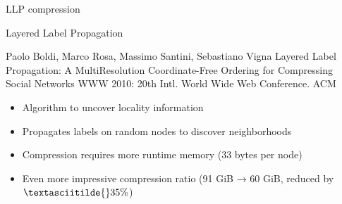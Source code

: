 \documentclass[aspectratio=169,xcolor=table]{beamer}
\begin{document}
    \begin{frame}{LLP compression}
        \begin{block}{Layered Label Propagation}
            \begin{thebibliography}{Foo Bar, 1969}
                \small \vspace{-2mm}
                 Paolo Boldi, Marco Rosa, Massimo Santini, Sebastiano Vigna
                \newblock Layered Label Propagation: A MultiResolution Coordinate-Free Ordering for Compressing Social Networks
                \newblock WWW 2010: 20th Intl. World Wide Web Conference. ACM
            \end{thebibliography}
        \end{block}
        \begin{block}{}
            \begin{itemize}
                \item Algorithm to uncover locality information
                \item Propagates labels on random nodes to discover neighborhoods
                \item Compression requires more runtime memory (33 bytes per node)
                \item Even more impressive compression ratio (91 GiB → 60 GiB,
                    reduced by $\textasciitilde{}35\%$)
            \end{itemize}
        \end{block}
    \end{frame}
\end{document}
